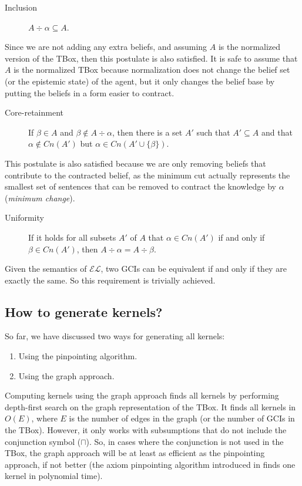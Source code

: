 \begin{description}
\item[Inclusion] $A \div \alpha \subseteq A$.
\end{description}
Since we are not adding any extra beliefs, and assuming $A$ is the normalized version of the TBox, then this postulate is also satisfied. It is safe to assume that $A$ is the normalized TBox because normalization does not change the belief set (or the epistemic state) of the agent, but it only changes the belief base by putting the beliefs in a form easier to contract.

\begin{description}
\item[Core-retainment] If $\beta \in A$ and $\beta \notin A \div \alpha$, then there is a set $A'$ such that $A' \subseteq A$ and that $\alpha \notin Cn(A')$ but $\alpha \in Cn(A' \cup \{ \beta \})$.
\end{description}
This postulate is also satisfied because we are only removing beliefs that contribute to the contracted belief, as the minimum cut actually represents the smallest set of sentences that can be removed to contract the knowledge by $\alpha$ (\textit{minimum change}).

\begin{description}
\item[Uniformity] If it holds for all subsets $A'$ of $A$ that $\alpha \in Cn(A')$ if and only if $\beta \in Cn(A')$, then $A \div \alpha = A \div \beta$.
\end{description}
Given the semantics of $\mathcal{EL}$, two GCIs can be equivalent if and only if they are exactly the same. So this requirement is trivially achieved.


\subsection{How to generate kernels?}
So far, we have discussed two ways for generating all kernels:
\begin{enumerate}
\item Using the pinpointing algorithm.
\item Using the graph approach.
\end{enumerate}
Computing kernels using the graph approach finds all kernels by performing depth-first search on the graph representation of the TBox. It finds all kernels in $O(E)$, where $E$ is the number of edges in the graph (or the number of GCIs in the TBox). However, it only works with subsumptions that do not include the conjunction symbol ($\sqcap$). So, in cases where the conjunction is not used in the TBox, the graph approach will be at least as efficient as the pinpointing approach, if not better (the axiom pinpointing algorithm introduced in \cite{pin} finds one kernel in polynomial time).


